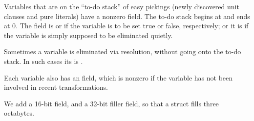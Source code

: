 Variables that are on the ``to-do stack'' of easy pickings (newly discovered
unit clauses and pure literals) have a nonzero  field. The to-do
stack begins at  and ends at 0. The  field is
 or  if the variable is to be set
true or false,
respectively; or it is  if the variable is simply supposed
to be eliminated quietly.

Sometimes a variable is eliminated via resolution,
without going onto the to-do stack. In such cases its  is .

Each variable also has an  field, which is nonzero if the
variable has not been involved in recent transformations.

We add a 16-bit  field, and a 32-bit filler field,
so that a  struct fills three octabytes.

